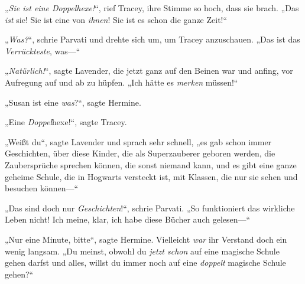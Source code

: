 „\emph{Sie ist eine Doppelhexe!}“, rief Tracey, ihre Stimme so hoch, dass sie brach. „Das \emph{ist} sie! Sie ist eine von \emph{ihnen}! Sie ist es schon die ganze Zeit!“

„\emph{Was?}“, schrie Parvati und drehte sich um, um Tracey anzuschauen. „Das ist das \emph{Verrückteste}, was—“

„\emph{Natürlich!}“, sagte Lavender, die jetzt ganz auf den Beinen war und anfing, vor Aufregung auf und ab zu hüpfen. „Ich hätte es \emph{merken} müssen!“

„Susan ist eine \emph{was}?“, sagte Hermine.

„Eine \emph{Doppel}{}hexe!“, sagte Tracey.

„Weißt du“, sagte Lavender und sprach sehr schnell, „es gab schon immer Geschichten, über diese Kinder, die als Superzauberer geboren werden, die Zaubersprüche sprechen können, die sonst niemand kann, und es gibt eine ganze geheime Schule, die in Hogwarts versteckt ist, mit Klassen, die nur sie sehen und besuchen können—“

„Das sind doch nur \emph{Geschichten}!“, schrie Parvati. „So funktioniert das wirkliche Leben nicht! Ich meine, klar, ich habe diese Bücher auch gelesen—“

„Nur eine Minute, bitte“, sagte Hermine. Vielleicht \emph{war} ihr Verstand doch ein wenig langsam. „Du meinst, obwohl du \emph{jetzt schon} auf eine magische Schule gehen darfst und alles, willst du immer noch auf eine \emph{doppelt} magische Schule gehen?“

